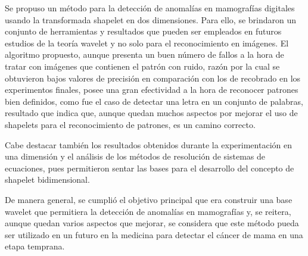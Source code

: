 \begin{conclusions}
    \par Se propuso un m\'etodo para la detecci\'on de anomal\'ias en mamograf\'ias digitales usando la transformada shapelet en dos dimensiones. Para ello, se brindaron un conjunto de herramientas y resultados que pueden ser empleados en futuros estudios de la teor\'ia wavelet y no solo para el reconocimiento en im\'agenes. El algoritmo propuesto, aunque presenta un buen n\'umero de fallos a la hora de tratar con im\'agenes que contienen el patr\'on con ruido, raz\'on por la cual se obtuvieron bajos valores de precisi\'on en comparaci\'on con los de recobrado en los experimentos finales, posee una gran efectividad a la hora de reconocer patrones bien definidos, como fue el caso de detectar una letra en un conjunto de palabras, resultado que indica que, aunque quedan muchos aspectos por mejorar el uso de shapelets para el reconocimiento de patrones, es un camino correcto.
    \par Cabe destacar tambi\'en los resultados obtenidos durante la experimentaci\'on en una dimensi\'on y el an\'alisis de los m\'etodos de resoluci\'on de sistemas de ecuaciones, pues permitieron sentar las bases para el desarrollo del concepto de shapelet bidimensional.
    \par De manera general, se cumpli\'o el objetivo principal que era construir una base wavelet que permitiera la detecci\'on de anomal\'ias en mamograf\'ias y, se reitera, aunque quedan varios aspectos que mejorar, se considera que este m\'etodo pueda ser utilizado en un futuro en la medicina para detectar el c\'ancer de mama en una etapa temprana.
\end{conclusions}
